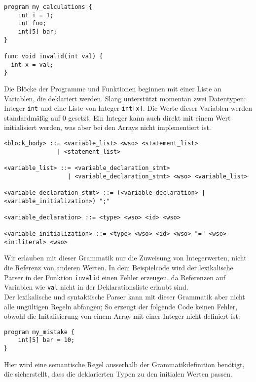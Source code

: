 \begin{lstlisting}[caption={Slang Beispiel Variablendeklarationen}]
program my_calculations {
    int i = 1;
    int foo;
    int[5] bar;
}

func void invalid(int val) {
  int x = val;
}
\end{lstlisting}

Die Blöcke der Programme und Funktionen beginnen mit einer Liste an Variablen, die deklariert werden.
Slang unterstützt momentan zwei Datentypen: Integer \texttt{int} und eine Liste von Integer \texttt{int[x]}.
Die Werte dieser Variablen werden standardmäßig auf 0 gesetzt.
Ein Integer kann auch direkt mit einem Wert initialisiert werden, was aber bei den Arrays nicht implementiert ist.

\begin{lstlisting}[caption={Grammatikdefinition Variablendeklarationen}]
<block_body> ::= <variable_list> <wso> <statement_list>
               | <statement_list>

<variable_list> ::= <variable_declaration_stmt>
                  | <variable_declaration_stmt> <wso> <variable_list>

<variable_declaration_stmt> ::= (<variable_declaration> | <variable_initialization>) ";"

<variable_declaration> ::= <type> <wso> <id> <wso>

<variable_initialization> ::= <type> <wso> <id> <wso> "=" <wso> <intliteral> <wso>
\end{lstlisting}

Wir erlauben mit dieser Grammatik nur die Zuweisung von Integerwerten, nicht die Referenz von anderen Werten.
In dem Beispielcode wird der lexikalische Parser in der Funktion \texttt{invalid} einen Fehler erzeugen, da Referenzen auf Variablen wie \texttt{val} nicht in der Deklarationsliste erlaubt sind.\\

Der lexikalische und syntaktische Parser kann mit dieser Grammatik aber nicht alle ungültigen Regeln abfangen;
So erzeugt der folgende Code keinen Fehler, obwohl die Initalisierung von einem Array mit einer Integer nicht definiert ist:

\begin{lstlisting}[caption={Slang Beispiel: fehlerhafter Wert in der Initialisierung}]
program my_mistake {
    int[5] bar = 10;
}
\end{lstlisting}

Hier wird eine semantische Regel ausserhalb der Grammatikdefinition benötigt, die sicherstellt, dass die deklarierten Typen zu den initialen Werten passen.\\

